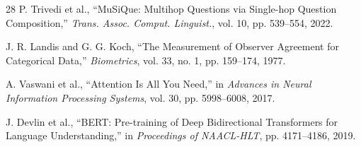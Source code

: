 \documentclass[conference]{IEEEtran}
\begin{document}
\begin{thebibliography}{28}
P. Trivedi et al., ``MuSiQue: Multihop Questions via Single-hop Question Composition,'' \textit{Trans. Assoc. Comput. Linguist.}, vol. 10, pp. 539--554, 2022.

J. R. Landis and G. G. Koch, ``The Measurement of Observer Agreement for Categorical Data,'' \textit{Biometrics}, vol. 33, no. 1, pp. 159--174, 1977.

A. Vaswani et al., ``Attention Is All You Need,'' in \textit{Advances in Neural Information Processing Systems}, vol. 30, pp. 5998--6008, 2017.

J. Devlin et al., ``BERT: Pre-training of Deep Bidirectional Transformers for Language Understanding,'' in \textit{Proceedings of NAACL-HLT}, pp. 4171--4186, 2019.

\end{thebibliography}
\end{document}
